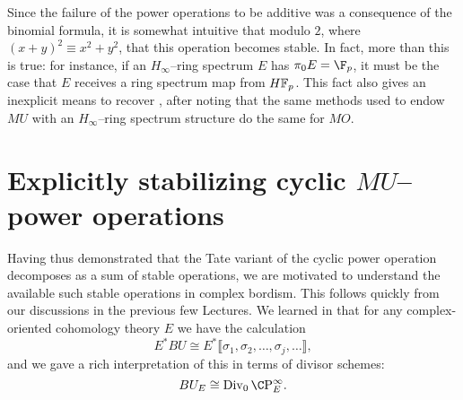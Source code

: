 \begin{remark}\label{HinftyRingsModp}
Since the failure of the power operations to be additive was a consequence of the binomial formula, it is somewhat intuitive that modulo \(2\), where \((x + y)^2 \equiv x^2 + y^2\), that this operation becomes stable.  In fact, more than this is true: for instance, if an \(H_\infty\)--ring spectrum \(E\) has \(\pi_0 E = \F_p\), it must be the case that \(E\) receives a ring spectrum map from \(\HFp\).  This fact also gives an inexplicit means to recover , after noting that the same methods used to endow \(MU\) with an \(H_\infty\)--ring spectrum structure do the same for \(MO\).
\end{remark}















\section{Explicitly stabilizing cyclic \texorpdfstring{\(MU\)}{MU}--power operations}\label{StabilizingTheMUSteenrodOps}

Having thus demonstrated that the Tate variant of the cyclic power operation decomposes as a sum of stable operations, we are motivated to understand the available such stable operations in complex bordism.  This follows quickly from our discussions in the previous few Lectures.  We learned in  that for any complex-oriented cohomology theory \(E\) we have the calculation \[E^* BU \cong E^*\llbracket \sigma_1, \sigma_2, \ldots, \sigma_j, \ldots\rrbracket,\] and we gave a rich interpretation of this in terms of divisor schemes: \[BU_E \cong \Div_0 \CP^\infty_E.\]


